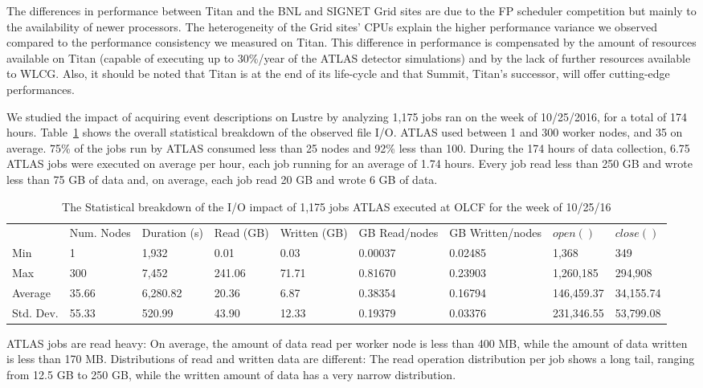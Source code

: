 The differences in performance between Titan and the BNL and SIGNET Grid
sites are due to the FP scheduler competition but mainly to the availability
of newer processors. 
The heterogeneity of the Grid sites' CPUs explain the higher performance
variance we observed compared to the performance consistency we measured on
Titan. This difference in performance is compensated by the amount of
resources available on Titan (capable of executing up to 30\%/year of the
ATLAS detector simulations) and by the lack of further resources available to
WLCG\@. Also, it should be noted that Titan is at the end of its life-cycle
and that Summit, Titan's successor, will offer cutting-edge performances.

We studied the impact of acquiring event descriptions on Lustre by analyzing
1,175 jobs ran on the week of 10/25/2016, for a total of 174 hours.
Table~\ref{panda-olcf-stats} shows the overall statistical breakdown of the
observed file I/O. ATLAS used between 1 and 300 worker nodes, and 35 on
average. 75\% of the jobs run by ATLAS consumed less than 25 nodes and 92\%
less than 100. During the 174 hours of data collection, 6.75 ATLAS jobs were
executed on average per hour, each job running for an average of 1.74 hours.
Every job read less than 250 GB and wrote less than 75 GB of data and, on
average, each job read 20 GB and wrote 6 GB of data.

\begin{table}[t]
\centering
\begin{tabular}{lllllllll} & Num. Nodes & Duration (s) & Read (GB) & Written
 (GB) & GB Read/nodes & GB Written/nodes & \(open()\) & \(close()\) \\ Min & 1 &
 1,932 & 0.01 & 0.03 & 0.00037 & 0.02485 & 1,368 & 349 \\ Max & 300 & 7,452 &
 241.06 & 71.71 & 0.81670 & 0.23903 & 1,260,185 & 294,908 \\ Average & 35.66
 & 6,280.82 & 20.36 & 6.87 & 0.38354 & 0.16794 & 146,459.37 & 34,155.74 \\
 Std. Dev. & 55.33 & 520.99 & 43.90 & 12.33 & 0.19379 & 0.03376 & 231,346.55
 & 53,799.08
\end{tabular}
\caption{The Statistical breakdown of the I/O impact of 1,175 jobs ATLAS
executed at OLCF for the week of 10/25/16}\label{panda-olcf-stats}
\end{table}

ATLAS jobs are read heavy: On average, the amount of data read per worker
node is less than 400 MB, while the amount of data written is less than 170
MB\@. Distributions of read and written data are different: The read
operation distribution per job shows a long tail, ranging from 12.5 GB to 250
GB, while the written amount of data has a very narrow distribution.

